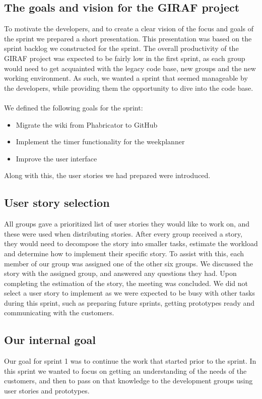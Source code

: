 \subsection{The goals and vision for the GIRAF project}
To motivate the developers, and to create a clear vision of the focus and goals of the sprint we prepared a short presentation.
This presentation was based on the sprint backlog we constructed for the sprint.
The overall productivity of the GIRAF project was expected to be fairly low in the first sprint, as each group would need to get acquainted with the legacy code base, new groups and the new working environment.
As such, we wanted a sprint that seemed manageable by the developers, while providing them the opportunity to dive into the code base.
\\\\
We defined the following goals for the sprint:
\begin{itemize}
    \item Migrate the wiki from Phabricator to GitHub
    \item Implement the timer functionality for the weekplanner
    \item Improve the user interface
\end{itemize}
Along with this, the user stories we had prepared were introduced.

\subsection{User story selection}
All groups gave a prioritized list of user stories they would like to work on, and these were used when distributing stories.
After every group received a story, they would need to decompose the story into smaller tasks, estimate the workload and determine how to implement their specific story.
To assist with this, each member of our group was assigned one of the other six groups.
We discussed the story with the assigned group, and answered any questions they had.
Upon completing the estimation of the story, the meeting was concluded.
We did not select a user story to implement as we were expected to be busy with other tasks during this sprint, such as preparing future sprints, getting prototypes ready and communicating with the customers.

\subsection{Our internal goal}
Our goal for sprint 1 was to continue the work that started prior to the sprint.
In this sprint we wanted to focus on getting an understanding of the needs of the customers, and then to pass on that knowledge to the development groups using user stories and prototypes.

